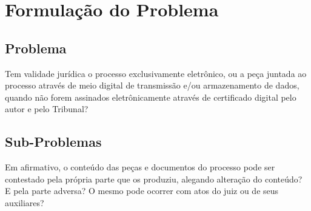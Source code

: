 \chapter{Formulação do Problema}

\section{Problema}
Tem validade jurídica o processo exclusivamente eletrônico, ou a
peça juntada ao processo através de meio digital de transmissão
e/ou armazenamento de dados, quando não forem assinados
eletrônicamente através de certificado digital pelo autor e pelo
Tribunal?

\section{Sub-Problemas}
Em afirmativo, o conteúdo das peças e documentos do processo pode
ser contestado pela própria parte que os produziu, alegando
alteração do conteúdo? E pela parte adversa? O mesmo pode ocorrer
com atos do juiz ou de seus auxiliares?
